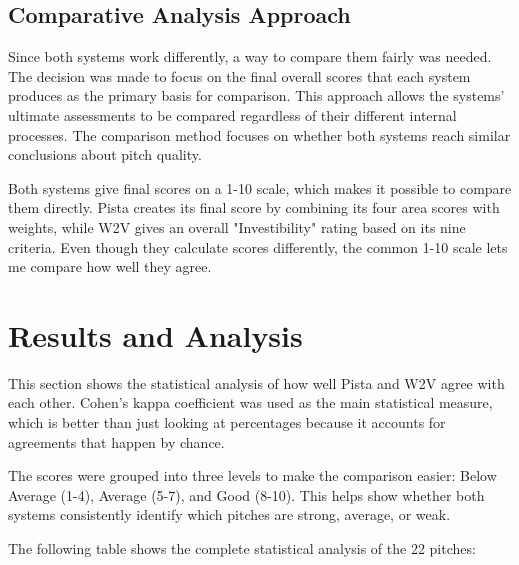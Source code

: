 \subsection{Comparative Analysis Approach}
\label{subsec:methodology-approach}

Since both systems work differently, a way to compare them fairly was needed. The decision was made to focus on the final overall scores that each system produces as the primary basis for comparison. This approach allows the systems' ultimate assessments to be compared regardless of their different internal processes. The comparison method focuses on whether both systems reach similar conclusions about pitch quality.

Both systems give final scores on a 1-10 scale, which makes it possible to compare them directly. Pista creates its final score by combining its four area scores with weights, while W2V gives an overall "Investibility" rating based on its nine criteria. Even though they calculate scores differently, the common 1-10 scale lets me compare how well they agree.

\section{Results and Analysis}
\label{sec:inter-rater-reliability}

This section shows the statistical analysis of how well Pista and W2V agree with each other. Cohen's kappa coefficient was used as the main statistical measure, which is better than just looking at percentages because it accounts for agreements that happen by chance.

The scores were grouped into three levels to make the comparison easier: Below Average (1-4), Average (5-7), and Good (8-10). This helps show whether both systems consistently identify which pitches are strong, average, or weak.

The following table shows the complete statistical analysis of the 22 pitches:

